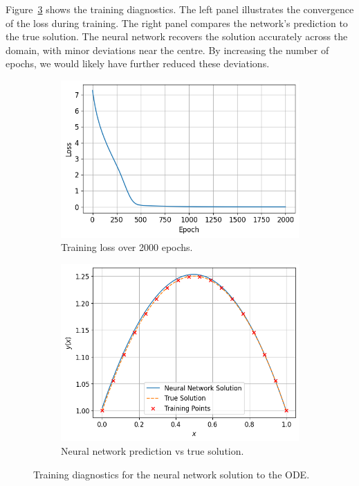 Figure~\ref{fig:prelim_nn_diagnostics} shows the training diagnostics. The left panel illustrates the 
convergence of the loss during training. The right panel compares the network's prediction to the 
true solution. The neural network recovers the solution accurately across the domain, with minor 
deviations near the centre. By increasing the number of epochs, we would likely have further
reduced these deviations.

\begin{figure}[t]
    \centering
    \begin{subfigure}[t]{0.48\textwidth}
        \centering
        \includegraphics[width=\textwidth]{graphics/prelim_nn_loss_curve.png}
        \caption{Training loss over 2000 epochs.}
        \label{fig:prelim_nn_loss}
    \end{subfigure}
    \hfill
    \begin{subfigure}[t]{0.48\textwidth}
        \centering
        \includegraphics[width=\textwidth]{graphics/prelim_nn_example.png}
        \caption{Neural network prediction vs true solution.}
        \label{fig:prelim_nn_model}
    \end{subfigure}
    \caption{Training diagnostics for the neural network solution to the ODE.}
    \label{fig:prelim_nn_diagnostics}
\end{figure}
